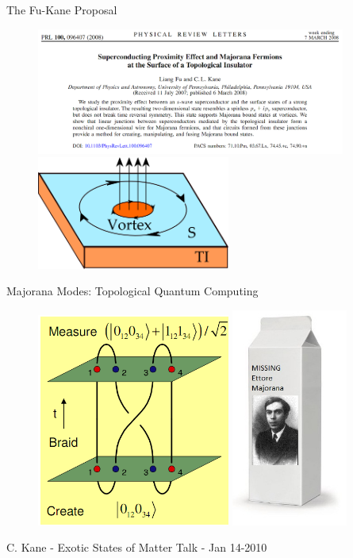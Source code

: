 \documentclass[]{beamer}
\begin{document}
\begin{frame}{The Fu-Kane Proposal}
\begin{figure}
\includegraphics[width=4in]{include/fukane-prl.png}\\
\includegraphics[width=2.5in]{include/majorana2.png}\\

\end{figure}
\end{frame}


\begin{frame}{Majorana Modes: Topological Quantum Computing}
\begin{figure}
\includegraphics[width=2.5in]{include/braid.png}
\includegraphics[width=1.5in]{include/milk-carton.jpg}

\end{figure}
C. Kane - Exotic States of Matter Talk - Jan 14-2010
\end{frame}
\end{document}
